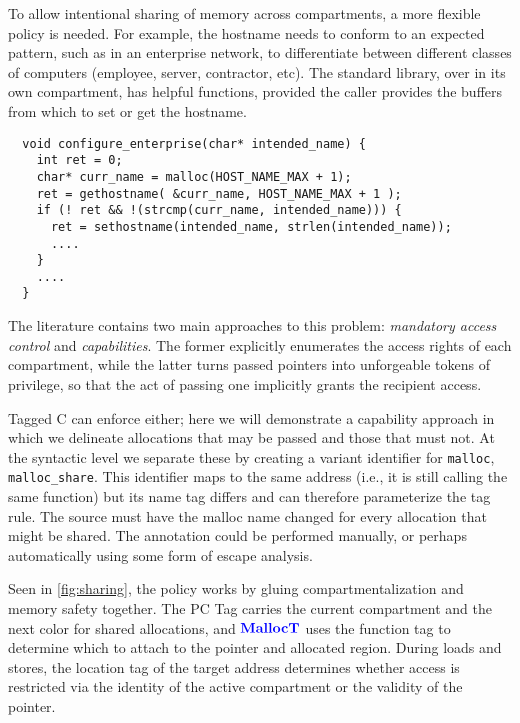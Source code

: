 \documentclass{llncs}
\begin{document}
To allow intentional sharing of memory across compartments, a more flexible policy is needed. 
For example, the hostname needs to conform to an expected pattern, 
such as in an enterprise network, to differentiate between different classes of
computers (employee, server, contractor, etc). The standard library, 
over in its own compartment, has helpful functions, 
provided the caller provides the buffers from which to set or get the hostname. 

\begin{verbatim}
  void configure_enterprise(char* intended_name) {
    int ret = 0;
    char* curr_name = malloc(HOST_NAME_MAX + 1);
    ret = gethostname( &curr_name, HOST_NAME_MAX + 1 );
    if (! ret && !(strcmp(curr_name, intended_name))) {
      ret = sethostname(intended_name, strlen(intended_name));
      ....
    }
    ....
  }
\end{verbatim}

The literature contains two main approaches to this problem:
{\em mandatory access control} and {\em capabilities}. The former explicitly
enumerates the access rights of each compartment, while the latter turns passed
pointers into unforgeable tokens of privilege, so that the act of passing one
implicitly grants the recipient access.

Tagged C can enforce either; here we will demonstrate a capability approach
in which we delineate allocations that may be passed and those that must not.
At the syntactic level we separate these by creating a variant identifier for {\tt malloc},
{\tt malloc\_share}. This identifier maps to the same address (i.e., it is still calling the same function)
but its name tag differs and can therefore parameterize the tag rule. The source
must have the malloc name changed for every allocation that might be shared.
The annotation could be performed manually, or perhaps automatically using some form
of escape analysis.

Seen in \cref{fig:sharing}, the policy works by gluing compartmentalization and memory safety
together. The PC Tag carries the current compartment and the next color for shared allocations,
and \(\color{blue} \mathbf{MallocT}\) uses the function tag to determine which to attach to the pointer and allocated
region. During loads and stores, the location tag of the target address
determines whether access is restricted via the identity of the active compartment or
the validity of the pointer.

\end{document}

